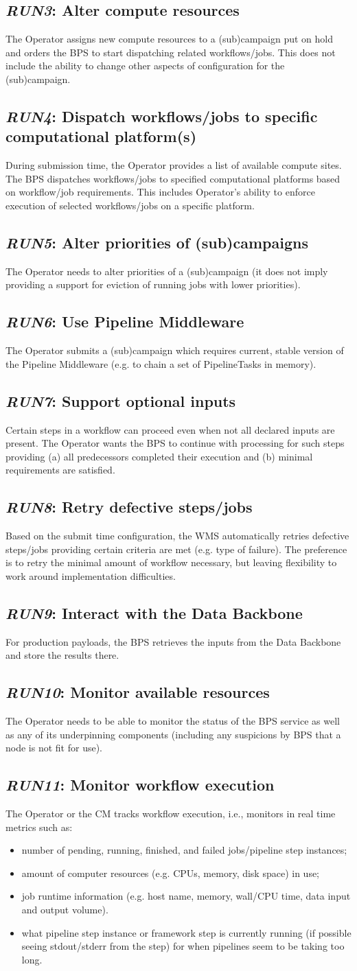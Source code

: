 \documentclass[DM,lsstdraft,toc]{lsstdoc}
\newcommand{\usecase}[2]{\subsection{\emph{#1}: #2}\label{use:#1}}
\begin{document}
\usecase{RUN3}{Alter compute resources}
The Operator assigns new compute resources to a (sub)campaign put on
hold and orders the BPS to start dispatching related workflows/jobs.
This does not include the ability to change other aspects of
configuration for the (sub)campaign.

\usecase{RUN4}{Dispatch workflows/jobs to specific computational platform(s)}
During submission time, the Operator provides a list of available
compute sites.  The BPS dispatches workflows/jobs to specified
computational platforms based on workflow/job requirements.  This
includes Operator's ability to enforce execution of selected
workflows/jobs on a specific platform.

\usecase{RUN5}{Alter priorities of (sub)campaigns}
The Operator needs to alter priorities of a (sub)campaign (it does not imply
providing a support for eviction of running jobs with lower priorities).

\usecase{RUN6}{Use Pipeline Middleware}
The Operator submits a (sub)campaign which requires current, stable version of the Pipeline  Middleware (e.g.  to chain a set of PipelineTasks in memory).

\usecase{RUN7}{Support optional inputs}
Certain steps in a workflow can proceed even when not all declared inputs are
present.  The Operator wants the BPS to continue with processing for such steps
providing (a) all predecessors completed their execution and (b) minimal
requirements are satisfied.

\usecase{RUN8}{Retry defective steps/jobs}
Based on the submit time configuration, the WMS automatically retries defective
steps/jobs providing certain criteria are met (e.g. type of failure).  The
preference is to retry the minimal amount of workflow necessary, but leaving
flexibility to work around implementation difficulties.

\usecase{RUN9}{Interact with the Data Backbone}
For production payloads, the BPS retrieves the inputs from the Data Backbone
and store the results there.

\usecase{RUN10}{Monitor available resources}
The Operator needs to be able to monitor the status of the BPS service as well
as any of its underpinning components (including any suspicions by BPS that a
node is not fit for use).

\usecase{RUN11}{Monitor workflow execution}
The Operator or the CM tracks workflow execution, i.e., monitors in real time
metrics such as:
\begin{itemize}
  \item
    number of pending, running, finished, and failed jobs/pipeline step
    instances;
  \item
    amount of computer resources (e.g. CPUs, memory, disk space) in use;
  \item
    job runtime information (e.g. host name, memory, wall/CPU time, data input
    and output volume).
  \item
    what pipeline step instance or framework step is currently running (if
    possible seeing stdout/stderr from the step) for when pipelines seem to be
    taking too long.
\end{itemize}
\end{document}
